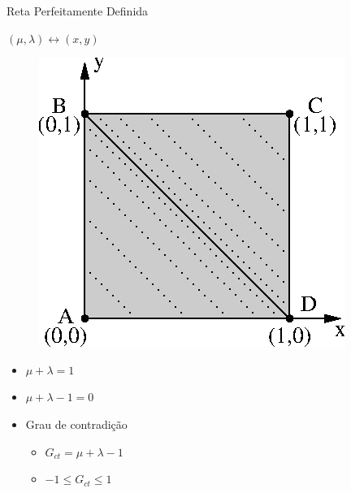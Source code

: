\begin{frame}{Reta Perfeitamente Definida}
\begin{block}{ \centering   $(\mu, \lambda ) \leftrightarrow (x,y) $ } \end{block}
\vspace{1cm}
\begin{minipage}{0.50\linewidth}
\begin{figure}[!htb]
\center\includegraphics[scale=1.0]{./imagens/C424retaPerfeitamenteDefinida.eps}
\end{figure}
\end{minipage}
\begin{minipage}{0.45\linewidth}

\begin{itemize}
\item $\mu + \lambda = 1$
\item $\mu + \lambda - 1 = 0$
\item Grau de contradição
  \begin{itemize}
    \item $G _{ct} = \mu + \lambda - 1$
    \item $-1 \leqslant G _{ct} \leqslant 1$
  \end{itemize}
\end{itemize}
\end{minipage}

\end{frame}

